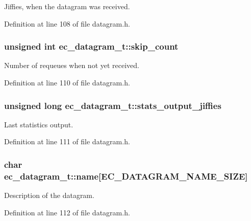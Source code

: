 Jiffies, when the datagram was received. 



Definition at line 108 of file datagram.\-h.

\subsubsection[{skip\-\_\-count}]{\setlength{\rightskip}{0pt plus 5cm}unsigned int ec\-\_\-datagram\-\_\-t\-::skip\-\_\-count}\label{structec__datagram__t_af7007d254b40111c064caaac6f9c4f81}


Number of requeues when not yet received. 



Definition at line 110 of file datagram.\-h.

\subsubsection[{stats\-\_\-output\-\_\-jiffies}]{\setlength{\rightskip}{0pt plus 5cm}unsigned long ec\-\_\-datagram\-\_\-t\-::stats\-\_\-output\-\_\-jiffies}\label{structec__datagram__t_a9a6c9216d340b19a47e802ce89fbb269}


Last statistics output. 



Definition at line 111 of file datagram.\-h.

\subsubsection[{name}]{\setlength{\rightskip}{0pt plus 5cm}char ec\-\_\-datagram\-\_\-t\-::name[{\bf E\-C\-\_\-\-D\-A\-T\-A\-G\-R\-A\-M\-\_\-\-N\-A\-M\-E\-\_\-\-S\-I\-Z\-E}]}\label{structec__datagram__t_af2690854e7fb1c410aa37a1ed225836d}


Description of the datagram. 



Definition at line 112 of file datagram.\-h.

